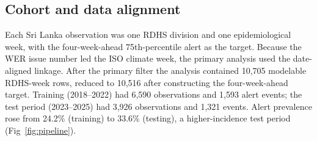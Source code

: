 \documentclass[11pt,a4paper]{article}
\begin{document}
\subsection{Cohort and data alignment}
Each Sri Lanka observation was one RDHS division and one epidemiological week, with the four-week-ahead 75th-percentile alert as the target. Because the WER issue number led the ISO climate week, the primary analysis used the date-aligned linkage. After the primary filter the analysis contained 10{,}705 modelable RDHS-week rows, reduced to 10{,}516 after constructing the four-week-ahead target. Training (2018--2022) had 6{,}590 observations and 1{,}593 alert events; the test period (2023--2025) had 3{,}926 observations and 1{,}321 events. Alert prevalence rose from 24.2\% (training) to 33.6\% (testing), a higher-incidence test period (Fig~\ref{fig:pipeline}).
\end{document}

